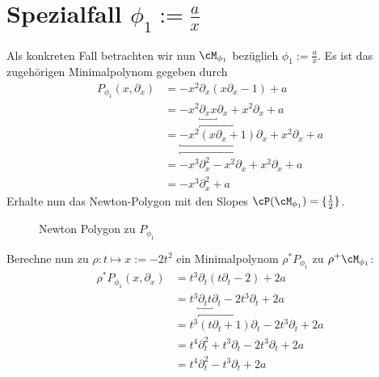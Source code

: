 \section{Spezialfall $\phi_1:=\frac{a}{x}$}
Als konkreten Fall betrachten wir nun $\cM_{\phi_1}$ bezüglich
$\phi_1:=\frac{a}{x}$. Es ist das zugehörigen Minimalpolynom gegeben durch
\begin{align*}
P_{\phi_1}(x,\partial_x) &=-x^2\partial_x (x\partial_x-1)+a
\\&=-x^2\underbracket{\partial_xx}\partial_x+x^2\partial_x+a
\\&=\underbracket{-x^2\overbracket{(x\partial_x+1)}\partial_x} + x^2\partial_x
  + a
\\&=\overbracket{-x^3\partial_x^2 - x^2\partial_x}+x^2\partial_x+a
\\&=-x^3\partial_x^2+a
\end{align*}
Erhalte nun das Newton-Polygon mit den Slopes
$\cP(\cM_{\phi_1})=\{\frac{1}{2}\}$.
\begin{figure}[H] %
\begin{center}
\end{center}
\caption{Newton Polygon zu $P_{\phi_1}$}
\end{figure}
Berechne nun zu $\rho:t\mapsto x:=-2t^2$ ein Minimalpolynom $\rho^*P_{\phi_1}$
zu $\rho^+\cM_{\phi_1}$:
\begin{align*}
\rho^*P_{\phi_1}(x,\partial_x)
  &=t^{3}\partial_t(t\partial_t-2)+2a\\
  &=t^{3}\underbracket{\partial_tt}\partial_t-2t^{3}\partial_t+2a\\
  &=t^{3}\overbracket{(t\partial_t+1)}\partial_t-2t^{3}\partial_t+2a\\
  &=t^{4}\partial_t^2+t^{3}\partial_t-2t^{3}\partial_t+2a\\
  &=t^{4}\partial_t^2-t^{3}\partial_t+2a
\end{align*}
\iffalse
  \begin{comment}
  \begin{align*}
  \rho^*P_{\phi_1}(x,\partial_x)
    &=-\frac{1}{2}t^{3}\partial_t
      (\frac{1}{2}t\partial_t-1)+a\\
    &=-\frac{1}{4}t^{3}\underbracket{\partial_tt}\partial_t
      +\frac{1}{2}t^{3}\partial_t+a\\
    &=-\frac{1}{4}t^{3}\overbracket{(t\partial_t+1)}\partial_t
      +\frac{1}{2}t^{3}\partial_t+a\\
    &=-\frac{1}{4}t^{4}\partial_t^2
      \underbracket{-\frac{1}{4}t^{3}\partial_t+\frac{1}{2}t^{3}\partial_t}+a\\
    &=-\frac{1}{4}t^{4}\partial_t^2
      \overbracket{+\frac{1}{4}t^{3}\partial_t}+a
  \end{align*}
  \end{comment}

